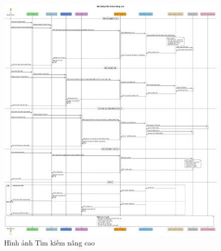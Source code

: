 \begin{figure}[H]
    \centering
    \includegraphics[width=1\textwidth]{image/sequence/tim-kiem-nang-cao.png}
    \caption{Hình ảnh Tìm kiếm nâng cao}
    \label{fig:tim_kiem_nang_cao}
\end{figure}
